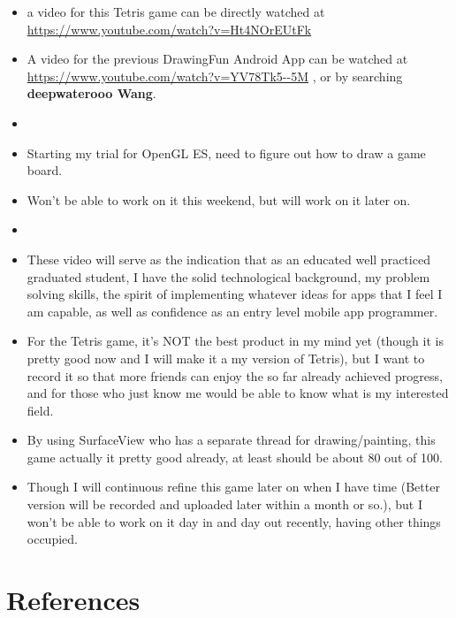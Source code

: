 \documentclass[9pt,b5paper]{article}
\begin{document}
\begin{itemize}
\item a video for this Tetris game can be directly watched at \url{https://www.youtube.com/watch?v=Ht4NOrEUtFk}
\item A video for the previous DrawingFun Android App can be watched at \url{https://www.youtube.com/watch?v=YV78Tk5--5M} , or by searching \textbf{deepwaterooo Wang}.
\item 
\item Starting my trial for OpenGL ES, need to figure out how to draw a game board.
\item Won't be able to work on it this weekend, but will work on it later on.
\item 
\item These video will serve as the indication that as an educated well practiced graduated student, I have the solid technological background, my problem solving skills, the spirit of implementing whatever ideas for apps that I feel I am capable, as well as confidence as an entry level mobile app programmer.
\item For the Tetris game, it's NOT the best product in my mind yet (though it is pretty good now and I will make it a my version of Tetris), but I want to record it so that more friends can enjoy the so far already achieved progress, and for those who just know me would be able to know what is my interested field.
\item By using SurfaceView who has a separate thread for drawing/painting, this game actually it pretty good already, at least should be about 80 out of 100.
\item Though I will continuous refine this game later on when I have time (Better version will be recorded and uploaded later within a month or so.), but I won't be able to work on it day in and day out recently, having other things occupied.
\end{itemize}

\section{References}
\label{sec-2}
\end{document}
